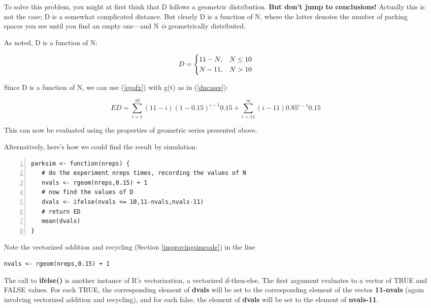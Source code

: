 To solve this problem, you might at first think that D follows a
geometric distribution. {\bf But don't jump to conclusions!}  Actually
this is not the case; D is a somewhat complicated distance.  But clearly
D is a function of N, where the latter denotes the number of parking
spaces you see until you find an empty one---and N {\it is}
geometrically distributed.

As noted, D is a function of N: 

\begin{equation}
\label{dncases}
D = 
\begin{cases}
11-N,  & N \leq 10 \cr
N-11,  & N  > 10 \cr
\end{cases}
\end{equation}

Since D is a function of N, we can use (\ref{egofx}) with g(t) as in
(\ref{dncases}):

\begin{equation}
\label{expectdist}
ED = \sum_{i=1}^{10} (11-i) (1-0.15)^{i-1} 0.15 +
\sum_{i=11}^{\infty} (i-11) 0.85^{i-1} 0.15 
\end{equation}

This can now be evaluated using the properties of geometric series
presented above.

Alternatively, here's how we could find the result by simulation:

\begin{lstlisting}[numbers=left]
parksim <- function(nreps) {
   # do the experiment nreps times, recording the values of N
   nvals <- rgeom(nreps,0.15) + 1
   # now find the values of D
   dvals <- ifelse(nvals <= 10,11-nvals,nvals-11)
   # return ED
   mean(dvals)
}
\end{lstlisting}

Note the vectorized addition and recycling (Section
\ref{improvingsimcode}) in the line

\begin{lstlisting}
nvals <- rgeom(nreps,0.15) + 1
\end{lstlisting}

The call to {\bf ifelse()} is another instance of R's vectorization, a
vectorized if-then-else.  The first argument evaluates to a vector of
TRUE and FALSE values.  For each TRUE, the corresponding element of {\bf
dvals} will be set to the corresponding element of the vector {\bf
11-nvals} (again involving vectorized addition and recycling), and for
each false, the element of {\bf dvals} will be set to the element of
{\bf nvals-11}.


